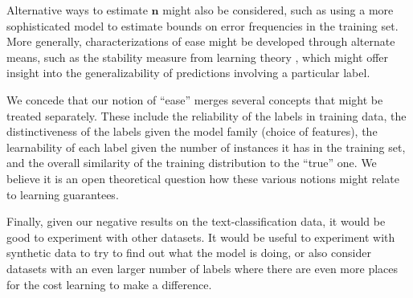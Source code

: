 \documentclass{article} %
\begin{document}
Alternative ways to estimate $\mathbf{n}$ might also be considered,
such as using a more sophisticated model to estimate bounds on error
frequencies in the training set.  More generally, characterizations of
ease might be developed through alternate means, such as the
stability measure from learning theory \citep{mukherjee2006learning},
which might offer insight into the generalizability of predictions
involving a particular label.

We concede that our notion of ``ease'' merges several concepts that
might be treated separately.  These include the reliability of the
labels in training data, the distinctiveness of the labels given the
model family (choice of features), the learnability of each label
given the number of instances it has in the training set, and the
overall similarity of the training distribution to the ``true'' one.
We believe it is an open theoretical question how these various
notions might relate to learning guarantees.

Finally, given our negative results on the text-classification data,
it would be good to experiment with other datasets.  It would be useful
to experiment with synthetic data to try to find out what the model
is doing, or also consider datasets with an even larger number of 
labels where there are even more places for the cost learning to make
a difference.




\end{document}
